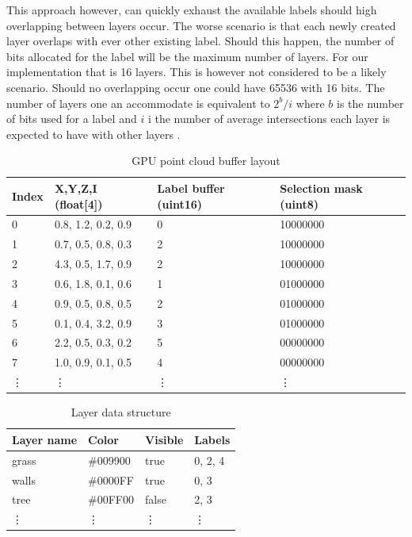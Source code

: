 This approach however, can quickly exhaust the available labels should high overlapping between layers occur. The worse scenario is that each newly created layer overlaps with ever other existing label. Should this happen, the number of bits allocated for the label will be the maximum number of layers. For our implementation that is 16 layers. This is however not considered to be a likely scenario. Should no overlapping occur one could have 65536 with 16 bits. The number of layers one an accommodate is equivalent to $2^b/i$ where $b$ is the number of bits used for a label and $i$ i the number of average intersections each layer is expected to have with other layers .



\begin{table}[ht]
	\begin{center}
	\begin{tabular}{|l|l|l|l|}
	\hline
	Index & X,Y,Z,I (float{[}4{]}) & Label buffer (uint16) & Selection mask (uint8)\\
	\hline
	0     & 0.8, 1.2, 0.2, 0.9 & 0                     & 10000000               \\
	1     & 0.7, 0.5, 0.8, 0.3 & 2                     & 10000000               \\
	2     & 4.3, 0.5, 1.7, 0.9 & 2                     & 10000000               \\
	3     & 0.6, 1.8, 0.1, 0.6 & 1                     & 01000000               \\
	4     & 0.9, 0.5, 0.8, 0.5 & 2                     & 01000000               \\
	5     & 0.1, 0.4, 3.2, 0.9 & 3                     & 01000000               \\
	6     & 2.2, 0.5, 0.3, 0.2 & 5                     & 00000000               \\
	7     & 1.0, 0.9, 0.1, 0.5 & 4                     & 00000000               \\
	\vdots     & \vdots & \vdots  & \vdots             \\
	\hline
	\end{tabular}
	\end{center}
	\caption{GPU point cloud buffer layout}
\end{table}


\begin{table}[ht]
	\begin{center}
	\begin{tabular}{|l|l|l|l|}
	\hline
	Layer  name & Color    & Visible & Labels \\
	\hline
	grass       & \#009900 & true & 0, 2, 4      \\
	walls       & \#0000FF & true & 0, 3  \\
	tree        & \#00FF00 & false & 2, 3   \\
	\vdots     & \vdots & \vdots   & \vdots          \\
	\hline
	\end{tabular}
	\end{center}
	\caption{Layer data structure}
\end{table}


